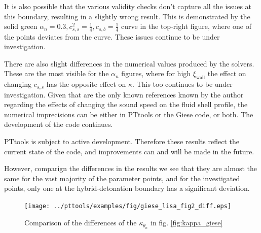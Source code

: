 It is also possible that the various validity checks don't capture all the issues at this boundary,
resulting in a slightly wrong result.
This is demonstrated by the solid green $\alpha_n = 0.3, c_{s,s}^2 = \frac{1}{4}, c_{s,b} = \frac{1}{4}$ curve in the top-right figure,
where one of the points deviates from the curve.
These issues continue to be under investigation.

There are also slight differences in the numerical values produced by the solvers.
These are the most visible for the $\alpha_n$ figures, where for high $\xi_\text{wall}$ the effect on changing $c_{s,s}$ has the opposite effect on $\kappa$.
This too continues to be under investigation.
Given that \cites{giese_2020}{giese_2021} are the only known references known by the author regarding the effects of changing the sound speed on the fluid shell profile,
the numerical imprecisions can be either in PTtools or the Giese code, or both.
The development of the code continues.

PTtools is subject to active development.
Therefore these results reflect the current state of the code,
and improvements can and will be made in the future.

However, comparign the differences in the results we see that they are almost the same for the vast majority of the parameter points, and for the investigated points, only one at the hybrid-detonation boundary has a significant deviation.

\begin{figure}[ht!]
\centering
\texttt{[image: ../pttools/examples/fig/giese\_lisa\_fig2\_diff.eps]}
\caption{Comparison of the differences of the $\kappa_{\bar{\theta}_n}$ in fig. \ref{fig:kappa_giese}}
\label{fig:kappa_giese_diff}
\end{figure}

